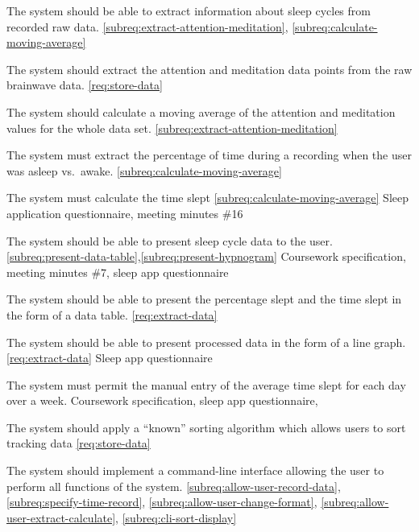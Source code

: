{The system should be able to extract information about sleep cycles from recorded raw data.}
{\phigh}
{\ref{subreq:extract-attention-meditation}, \ref{subreq:calculate-moving-average}}
{}

{The system should extract the attention and meditation data points from the raw brainwave data.}
{\phigh}
{\ref{req:store-data}}
{}

{The system should calculate a moving average of the attention and meditation values for the whole
  data set.}
{\phigh}
{\ref{subreq:extract-attention-meditation}}
{}

{The system must extract the percentage of time during a recording when the user was asleep vs.\
  awake.}
{\phigh}
{\ref{subreq:calculate-moving-average}}
{}

{The system must calculate the time slept}
{\phigh}
{\ref{subreq:calculate-moving-average}}
{Sleep application questionnaire, meeting minutes \#16}

{The system should be able to present sleep cycle data to the user.}
{\phigh}
{\ref{subreq:present-data-table},\ref{subreq:present-hypnogram}}
{Coursework specification, meeting minutes \#7, sleep app questionnaire}

{The system should be able to present the percentage slept and the time slept in the form of a data table.}
{\phigh}
{\ref{req:extract-data}}
{}

{The system should be able to present processed data in the form of a line graph.}
{\phigh}
{\ref{req:extract-data}}
{Sleep app questionnaire}

{The system must permit the manual entry of the average time slept for each day over a week.}
{\pmed}
{\dnone}
{Coursework specification, sleep app questionnaire, \textcite{British-Medical-Association:2018aa}}

{The system should apply a ``known'' sorting algorithm which allows users to sort tracking data}
{\pmed}
{\ref{req:store-data}}
{\sspec}

{The system should implement a command-line interface allowing the user to perform all functions
  of the system.}
{\phigh}
{\ref{subreq:allow-user-record-data}, \ref{subreq:specify-time-record},
  \ref{subreq:allow-user-change-format}, \ref{subreq:allow-user-extract-calculate},
  \ref{subreq:cli-sort-display}}
{}

